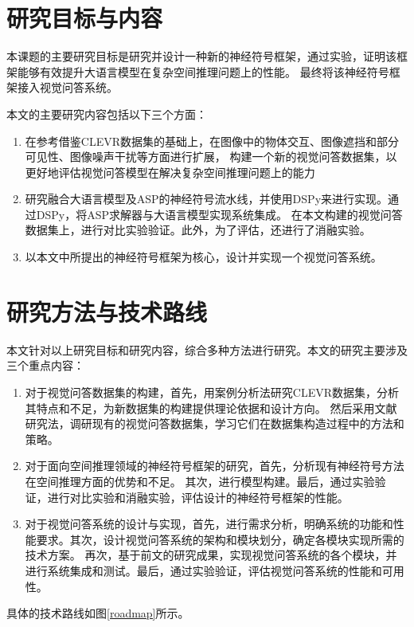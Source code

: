 \section{研究目标与内容}
本课题的主要研究目标是研究并设计一种新的神经符号框架，通过实验，证明该框架能够有效提升大语言模型在复杂空间推理问题上的性能。
最终将该神经符号框架接入视觉问答系统。

本文的主要研究内容包括以下三个方面：

\begin{enumerate}[label=(\arabic*),itemsep=0pt,parsep=0pt]
    \item 在参考借鉴CLEVR数据集的基础上，在图像中的物体交互、图像遮挡和部分可见性、图像噪声干扰等方面进行扩展，
构建一个新的视觉问答数据集，以更好地评估视觉问答模型在解决复杂空间推理问题上的能力
    \item 研究融合大语言模型及ASP的神经符号流水线，并使用DSPy来进行实现。通过DSPy，将ASP求解器与大语言模型实现系统集成。
在本文构建的视觉问答数据集上，进行对比实验验证。此外，为了评估，还进行了消融实验。
    \item 以本文中所提出的神经符号框架为核心，设计并实现一个视觉问答系统。
\end{enumerate}

\section{研究方法与技术路线}
本文针对以上研究目标和研究内容，综合多种方法进行研究。本文的研究主要涉及三个重点内容：
\begin{enumerate}[label=(\arabic*),itemsep=0pt,parsep=0pt]
    \item 对于视觉问答数据集的构建，首先，用案例分析法研究CLEVR数据集，分析其特点和不足，为新数据集的构建提供理论依据和设计方向。
然后采用文献研究法，调研现有的视觉问答数据集，学习它们在数据集构造过程中的方法和策略。
    \item 对于面向空间推理领域的神经符号框架的研究，首先，分析现有神经符号方法在空间推理方面的优势和不足。
其次，进行模型构建。最后，通过实验验证，进行对比实验和消融实验，评估设计的神经符号框架的性能。
    \item 对于视觉问答系统的设计与实现，首先，进行需求分析，明确系统的功能和性能要求。其次，设计视觉问答系统的架构和模块划分，确定各模块实现所需的技术方案。
再次，基于前文的研究成果，实现视觉问答系统的各个模块，并进行系统集成和测试。最后，通过实验验证，评估视觉问答系统的性能和可用性。
\end{enumerate}

具体的技术路线如图\ref{roadmap}所示。

